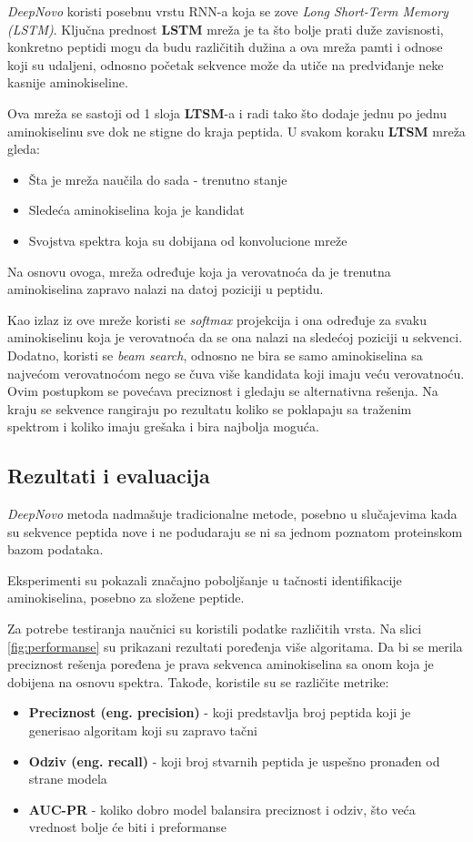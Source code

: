 \documentclass[12pt,oneside]{memoir}
\begin{document}
\emph{DeepNovo} koristi posebnu vrstu RNN-a koja se zove \emph{Long Short-Term Memory (LSTM)}. Ključna prednost \textbf{LSTM} mreža je ta što bolje prati duže zavisnosti, konkretno peptidi mogu da budu različitih dužina a ova mreža pamti i odnose koji su udaljeni, odnosno početak sekvence može da utiče na predviđanje neke kasnije aminokiseline.

Ova mreža se sastoji od 1 sloja \textbf{LTSM}-a i radi tako što dodaje jednu po jednu aminokiselinu sve dok ne stigne do kraja peptida. U svakom koraku \textbf{LTSM} mreža gleda:
\begin{itemize}
    \item Šta je mreža naučila do sada - trenutno stanje
    \item Sledeća aminokiselina koja je kandidat
    \item Svojstva spektra koja su dobijana od konvolucione mreže
\end{itemize}

Na osnovu ovoga, mreža određuje koja ja verovatnoća da je trenutna aminokiselina zapravo nalazi na datoj poziciji u peptidu.

Kao izlaz iz ove mreže koristi se \emph{softmax} projekcija i ona određuje za svaku aminokiselinu koja je verovatnoća da se ona nalazi na sledećoj poziciji u sekvenci. Dodatno, koristi se \emph{beam search}, odnosno ne bira se samo aminokiselina sa najvećom verovatnoćom nego se čuva više kandidata koji imaju veću verovatnoću. Ovim postupkom se povećava preciznost i gledaju se alternativna rešenja. Na kraju se sekvence rangiraju po rezultatu koliko se poklapaju sa traženim spektrom i koliko imaju grešaka i bira najbolja moguća.

\subsection{Rezultati i evaluacija}

\emph{DeepNovo} metoda nadmašuje tradicionalne metode, posebno u slučajevima kada su sekvence peptida nove i ne podudaraju se ni sa jednom poznatom proteinskom bazom podataka.

Eksperimenti su pokazali značajno poboljšanje u tačnosti identifikacije aminokiselina, posebno za složene peptide.

Za potrebe testiranja naučnici su koristili podatke različitih vrsta. Na slici \ref{fig:performanse} su prikazani rezultati poređenja više algoritama. Da bi se merila preciznost rešenja poređena je prava sekvenca aminokiselina sa onom koja je dobijena na osnovu spektra. 
Takođe, koristile su se različite metrike:
\begin{itemize}
    \item \textbf{Preciznost (eng. precision)} - koji predstavlja broj peptida koji je generisao algoritam koji su zapravo tačni
    \item \textbf{Odziv (eng. recall)} - koji broj stvarnih peptida je uspešno pronađen od strane modela
    \item \textbf{AUC-PR} - koliko dobro model balansira preciznost i odziv, što veća vrednost bolje će biti i preformanse
\end{itemize}
\end{document}
